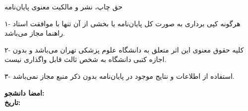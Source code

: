 
\begin{center}
    \vspace*{1.2cm}
    {\Titr\fontsize{18}{22}\selectfont حق چاپ، نشر و مالکیت معنوی پایان‌نامه}
\end{center}

\vspace{2em}

\noindent
۱- هرگونه کپی برداری به صورت کل پایان‌نامه یا بخشی از آن تنها با موافقت استاد راهنما مجاز می‌باشد.
\par

\noindent
۲- کلیه حقوق معنوی این اثر متعلق به دانشگاه علوم پزشکی تهران می‌باشد و بدون اجازه کتبی دانشگاه به شخص ثالث قابل واگذاری نیست.
\par

\noindent
۳- استفاده از اطلاعات و نتایج موجود در پایان‌نامه بدون ذکر منبع مجاز نمی‌باشد.

\vspace{2em}

\begin{flushleft}
  \bfseries
   امضا دانشجو: \hspace*{2cm}
  \\[1em]
  تاریخ: \hspace*{2cm}
\end{flushleft}

\clearpage
